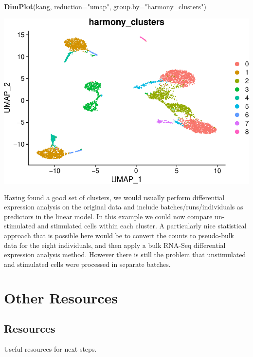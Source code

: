 \documentclass[
]{book}
\newenvironment{Shaded}{\begin{snugshade}}{\end{snugshade}}
\newcommand{\AttributeTok}[1]{\textcolor[rgb]{0.13,0.29,0.53}{#1}}
\newcommand{\FunctionTok}[1]{\textcolor[rgb]{0.13,0.29,0.53}{\textbf{#1}}}
\newcommand{\NormalTok}[1]{#1}
\newcommand{\StringTok}[1]{\textcolor[rgb]{0.31,0.60,0.02}{#1}}
\begin{document}
\begin{Shaded}
\begin{Highlighting}[]
\FunctionTok{DimPlot}\NormalTok{(kang, }\AttributeTok{reduction=}\StringTok{"umap"}\NormalTok{, }\AttributeTok{group.by=}\StringTok{"harmony\_clusters"}\NormalTok{)}
\end{Highlighting}
\end{Shaded}

\includegraphics{scRNAseqInR_Doco_files/figure-latex/unnamed-chunk-70-3.pdf}

Having found a good set of clusters, we would usually perform differential expression analysis on the original data and include batches/runs/individuals as predictors in the linear model. In this example we could now compare un-stimulated and stimulated cells within each cluster. A particularly nice statistical approach that is possible here would be to convert the counts to pseudo-bulk data for the eight individuals, and then apply a bulk RNA-Seq differential expression analysis method. However there is still the problem that unstimulated and stimulated cells were processed in separate batches.

\part{Other Resources}\label{part-other-resources}

\chapter{Resources}\label{resources}

Useful resources for next steps.
\end{document}
